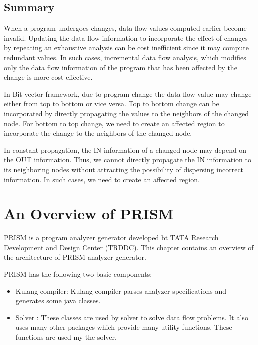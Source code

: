 \documentclass[11pt,a4paper,openright]{report}
\begin{document}
\section{Summary}
When a program undergoes changes, data flow values computed earlier become invalid. Updating the data flow information to incorporate the effect
of changes by repeating an exhaustive analysis can be cost inefficient since it may compute redundant values. In such cases, incremental data flow
analysis, which modifies only the data flow information of the program that has been affected by the change is more cost effective.

In Bit-vector framework, due to program change the data flow value may change either from top to bottom or vice versa. Top to bottom change can
be incorporated by directly propagating the values to the neighbors of the changed node. For bottom to top change, we need to create an affected 
region to incorporate the change to the neighbors of the changed node.

In constant propagation, the IN information of a changed node may depend on the OUT information. Thus, we cannot directly propagate
the IN information to its neighboring nodes without attracting the possibility of dispersing incorrect information. In such cases, we need to create an affected region.

\chapter{An Overview of PRISM}
PRISM is a program analyzer generator developed bt TATA Research Development and Design Center (TRDDC).
This chapter contains an overview of the architecture of PRISM analyzer generator.

PRISM has the following two basic components:
\begin{itemize}
 \item Kulang compiler: Kulang compiler parses analyzer specifications and generates some java classes.
 \item Solver : These classes are used by solver to solve data flow problems. It also uses many other packages which provide many utility functions. These functions are used 
 my the solver.
\end{itemize}
\end{document}
